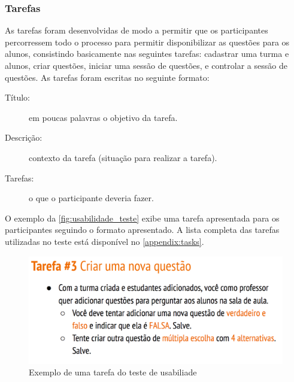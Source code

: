 \subsubsection{Tarefas}

As tarefas foram desenvolvidas de modo a permitir que os participantes
percorressem todo o processo para permitir disponibilizar as questões para os alunos,
consistindo basicamente nas seguintes tarefas: cadastrar uma turma e alunos, criar questões, iniciar uma sessão de questões,
e controlar a sessão de questões. As tarefas foram escritas no seguinte formato:

\begin{description}
  \item[Título:] em poucas palavras o objetivo da tarefa.
  \item[Descrição:] contexto da tarefa (situação para realizar a tarefa).
  \item[Tarefas:] o que o participante deveria fazer.
\end{description}

O exemplo da \autoref{fig:usabilidade_teste} exibe uma tarefa apresentada para
os participantes seguindo o formato apresentado. A lista completa das tarefas
utilizadas no teste está disponível no \autoref{appendix:tasks}.

\begin{figure}[!ht]
  \centering
  \caption{Exemplo de uma tarefa do teste de usabiliade}
  \label{fig:usabilidade_teste}
  \includegraphics[scale=0.23,valign=t]{imagens/usability_task}
  \doautor
\end{figure}
\clearpage

